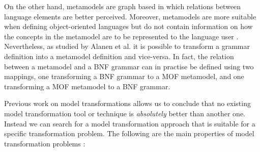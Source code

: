 On the other hand, metamodels are graph based in which relations between language elements are better perceived. Moreover, metamodels are more suitable when defining object-oriented languages but do not contain information on how the concepts in the metamodel are to be represented to the language user \cite{kleppe2007language}. Nevertheless, as studied by Alanen et al. \cite{alanen2003} it is possible to transform a grammar definition into a metamodel definition and vice-versa. In fact, the relation between a metamodel and a BNF grammar can in practise be defined using two mappings, one transforming a BNF grammar to a MOF metamodel,
and one transforming a MOF metamodel to a BNF grammar.

Previous work \cite{Czarnecki2006, biehl2010literature} on model transformations allows us to conclude that no existing model transformation tool or technique is \textit{absolutely} better than another one. Instead we can search for a model transformation approach that is suitable for a specific transformation problem. The following are the main properties of model transformation problems \cite{biehl2010literature}:

